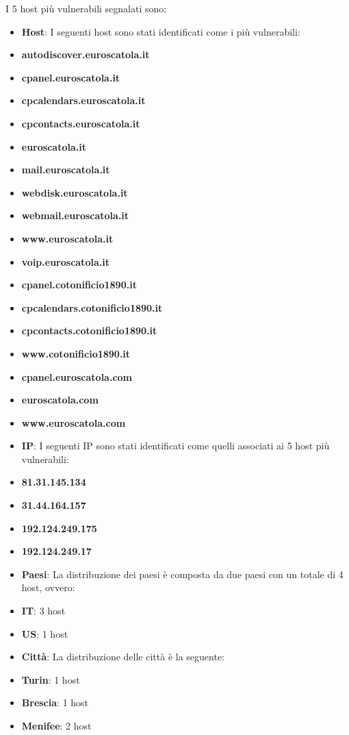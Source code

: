 I 5 host più vulnerabili segnalati sono:
\begin{itemize}
\item \textbf{Host}: I seguenti host sono stati identificati come i più vulnerabili:
\item \textbf{autodiscover.euroscatola.it}
\item \textbf{cpanel.euroscatola.it}
\item \textbf{cpcalendars.euroscatola.it}
\item \textbf{cpcontacts.euroscatola.it}
\item \textbf{euroscatola.it}
\item \textbf{mail.euroscatola.it}
\item \textbf{webdisk.euroscatola.it}
\item \textbf{webmail.euroscatola.it}
\item \textbf{www.euroscatola.it}
\item \textbf{voip.euroscatola.it}
\item \textbf{cpanel.cotonificio1890.it}
\item \textbf{cpcalendars.cotonificio1890.it}
\item \textbf{cpcontacts.cotonificio1890.it}
\item \textbf{www.cotonificio1890.it}
\item \textbf{cpanel.euroscatola.com}
\item \textbf{euroscatola.com}
\item \textbf{www.euroscatola.com}
\item \textbf{IP}: I seguenti IP sono stati identificati come quelli associati ai 5 host più vulnerabili:
\item \textbf{81.31.145.134}
\item \textbf{31.44.164.157}
\item \textbf{192.124.249.175}
\item \textbf{192.124.249.17}
\item \textbf{Paesi}: La distribuzione dei paesi è composta da due paesi con un totale di 4 host, ovvero:
\item \textbf{IT}: 3 host
\item \textbf{US}: 1 host
\item \textbf{Città}: La distribuzione delle città è la seguente:
\item \textbf{Turin}: 1 host
\item \textbf{Brescia}: 1 host
\item \textbf{Menifee}: 2 host
\end{itemize}

